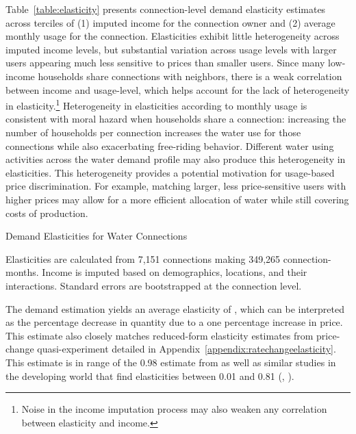 \documentclass[12pt]{article}
\begin{document}
Table~\ref{table:elasticity} presents connection-level demand elasticity estimates across terciles of (1) imputed income for the connection owner and (2) average monthly usage for the connection.  Elasticities exhibit little heterogeneity across imputed income levels, but substantial variation across usage levels with larger users appearing much less sensitive to prices than smaller users.  Since many low-income households share connections with neighbors, there is a weak correlation between income and usage-level, which helps account for the lack of heterogeneity in elasticity.\footnote{Noise in the income imputation process may also weaken any correlation between elasticity and income.}  Heterogeneity in elasticities according to monthly usage is consistent with moral hazard when households share a connection:  increasing the number of households per connection increases the water use for those connections while also exacerbating free-riding behavior.  Different water using activities across the water demand profile may also produce this heterogeneity in elasticities.  This heterogeneity provides a potential motivation for usage-based price discrimination.  For example, matching larger, less price-sensitive users with higher prices may allow for a more efficient allocation of water while still covering costs of production.
\begin{table}
\centering
\begin{threeparttable}
\caption{Demand Elasticities for Water Connections}\label{table:elasticity}
 
\begin{tablenotes}
\item {\footnotesize Elasticities are calculated from 7,151 connections making 349,265 connection-months.  Income is imputed based on demographics, locations, and their interactions.  Standard errors are bootstrapped at the connection level.}
\end{tablenotes}
\end{threeparttable}
\end{table}
The demand estimation yields an average elasticity of \unskip, which can be interpreted as the percentage decrease in quantity due to a one percentage increase in price.  This estimate also closely matches reduced-form elasticity estimates from price-change quasi-experiment detailed in Appendix~\ref{appendix:ratechangeelasticity}.  This estimate is in range of the 0.98 estimate from \cite{szabo2015value} as well as similar studies in the developing world that find elasticities between 0.01 and 0.81 (\cite{diakite2009proposal}, \cite{strand2005water}). 
\end{document}
